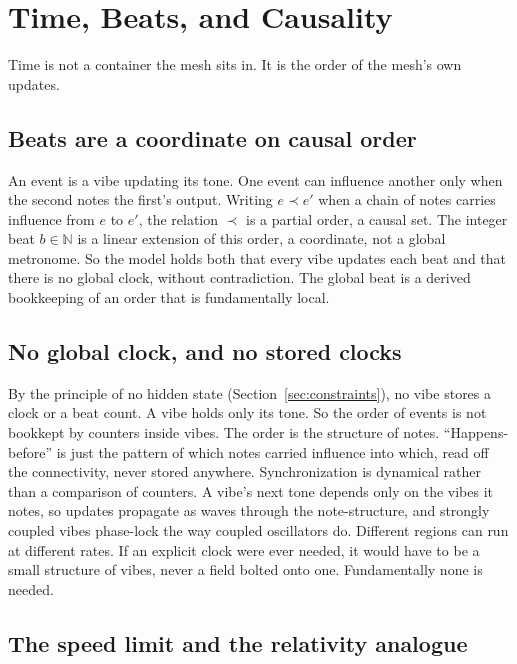 \section{Time, Beats, and Causality}
\label{sec:time}

Time is not a container the mesh sits in. It is the order of the mesh's own updates.

\subsection{Beats are a coordinate on causal order}

An event is a vibe updating its tone. One event can influence another only when the second notes the first's output. Writing $e \prec e'$ when a chain of notes carries influence from $e$ to $e'$, the relation $\prec$ is a partial order, a causal set. The integer beat $b \in \mathbb{N}$ is a linear extension of this order, a coordinate, not a global metronome. So the model holds both that every vibe updates each beat and that there is no global clock, without contradiction. The global beat is a derived bookkeeping of an order that is fundamentally local.

\subsection{No global clock, and no stored clocks}

By the principle of no hidden state (Section~\ref{sec:constraints}), no vibe stores a clock or a beat count. A vibe holds only its tone. So the order of events is not bookkept by counters inside vibes. The order is the structure of notes. ``Happens-before'' is just the pattern of which notes carried influence into which, read off the connectivity, never stored anywhere. Synchronization is dynamical rather than a comparison of counters. A vibe's next tone depends only on the vibes it notes, so updates propagate as waves through the note-structure, and strongly coupled vibes phase-lock the way coupled oscillators do. Different regions can run at different rates. If an explicit clock were ever needed, it would have to be a small structure of vibes, never a field bolted onto one. Fundamentally none is needed.

\subsection{The speed limit and the relativity analogue}

